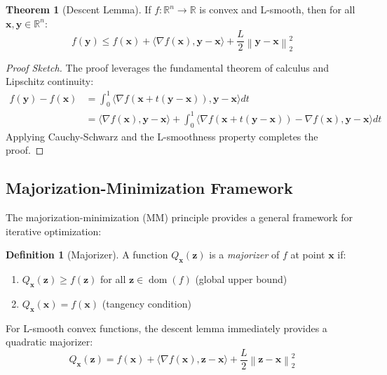 \documentclass[12pt]{article}
\renewcommand{\vec}[1]{\mathbf{#1}}
\newcommand{\norm}[1]{\left\lVert#1\right\rVert}
\newcommand{\inner}[2]{\langle #1, #2 \rangle}
\newcommand{\R}{\mathbb{R}}
\theoremstyle{definition}
\newtheorem{definition}{Definition}[section]
\newtheorem{theorem}{Theorem}[section]
\begin{document}
\begin{theorem}[Descent Lemma]\label{thm:descent}
    If $f: \R^n \to \R$ is convex and L-smooth, then for all $\vec{x}, \vec{y} \in \R^n$:
    \begin{equation}
        f(\vec{y}) \leq f(\vec{x}) + \inner{\nabla f(\vec{x})}{\vec{y} - \vec{x}} + \frac{L}{2}\norm{\vec{y} - \vec{x}}_2^2
        \label{eq:descent_lemma}
    \end{equation}
\end{theorem}

\begin{proof}[Proof Sketch]
    The proof leverages the fundamental theorem of calculus and Lipschitz continuity:
    \begin{align}
        f(\vec{y}) - f(\vec{x}) & = \int_0^1 \inner{\nabla f(\vec{x} + t(\vec{y} - \vec{x}))}{\vec{y} - \vec{x}} dt                                                                    \\
                                & = \inner{\nabla f(\vec{x})}{\vec{y} - \vec{x}} + \int_0^1 \inner{\nabla f(\vec{x} + t(\vec{y} - \vec{x})) - \nabla f(\vec{x})}{\vec{y} - \vec{x}} dt
    \end{align}
    Applying Cauchy-Schwarz and the L-smoothness property completes the proof.
\end{proof}

\subsection{Majorization-Minimization Framework}

The majorization-minimization (MM) principle provides a general framework for iterative optimization:

\begin{definition}[Majorizer]
    A function $Q_{\vec{x}}(\vec{z})$ is a \textit{majorizer} of $f$ at point $\vec{x}$ if:
    \begin{enumerate}
        \item $Q_{\vec{x}}(\vec{z}) \geq f(\vec{z})$ for all $\vec{z} \in \operatorname{dom}(f)$ (global upper bound)
        \item $Q_{\vec{x}}(\vec{x}) = f(\vec{x})$ (tangency condition)
    \end{enumerate}
\end{definition}

For L-smooth convex functions, the descent lemma immediately provides a quadratic majorizer:
\begin{equation}
    Q_{\vec{x}}(\vec{z}) = f(\vec{x}) + \inner{\nabla f(\vec{x})}{\vec{z} - \vec{x}} + \frac{L}{2}\norm{\vec{z} - \vec{x}}_2^2
    \label{eq:quadratic_majorizer}
\end{equation}
\end{document}
